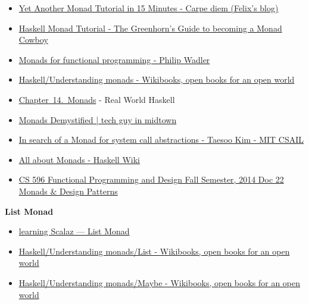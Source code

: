 \documentclass[11pt]{article}
\begin{document}
\begin{itemize}
\item \href{http://www.idryman.org/blog/2014/01/23/yet-another-monad-tutorial/}{Yet Another Monad Tutorial in 15 Minutes - Carpe diem (Felix's blog)}

\item \href{http://www.muitovar.com/monad/moncow.xhtml}{Haskell Monad Tutorial - The Greenhorn's Guide to becoming a Monad Cowboy}

\item \href{http://homepages.inf.ed.ac.uk/wadler/papers/marktoberdorf/baastad.pdf}{Monads for functional programming - Philip Wadler}

\item \href{https://en.wikibooks.org/wiki/Haskell/Understanding_monads}{Haskell/Understanding monads - Wikibooks, open books for an open world}

\item \href{http://book.realworldhaskell.org/read/monads.html}{Chapter 14. Monads} - Real World Haskell

\item \href{http://techguyinmidtown.com/2008/05/20/monads-demystified/}{Monads Demystified | tech guy in midtown}

\item \href{http://ocw.mit.edu/courses/mathematics/18-s996-category-theory-for-scientists-spring-2013/projects/MIT18_S996S13_Monad.pdf}{In search of a Monad for system call abstractions - Taesoo Kim - MIT CSAIL}

\item \href{https://wiki.haskell.org/All_About_Monads}{All about Monads - Haskell Wiki}

\item \href{http://www.eli.sdsu.edu/courses/fall14/cs596/notes/D22MonadsDesignPatterns.pdf}{CS 596 Functional Programming and Design Fall Semester, 2014 Doc 22 Monads \& Design Patterns}
\end{itemize}

\textbf{List Monad}

\begin{itemize}
\item \href{http://eed3si9n.com/learning-scalaz/List+Monad.html}{learning Scalaz — List Monad}

\item \href{https://en.wikibooks.org/wiki/Haskell/Understanding_monads/List}{Haskell/Understanding monads/List - Wikibooks, open books for an open world}

\item \href{https://en.wikibooks.org/wiki/Haskell/Understanding_monads/Maybe}{Haskell/Understanding monads/Maybe - Wikibooks, open books for an open world}
\end{itemize}
\end{document}

